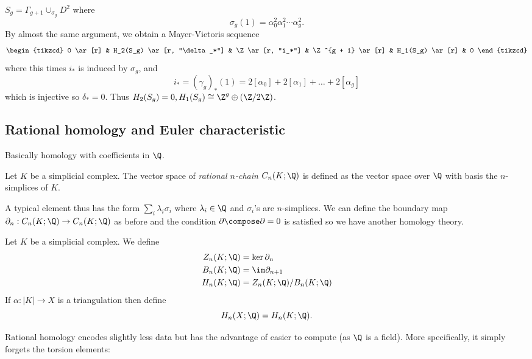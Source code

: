 \documentclass[a4paper]{article}
\renewcommand{\b}{\partial} %
\begin{document}
\begin{eg}
  \(S_g = \Gamma_{g + 1} \cup_{\sigma_g} D^2\) where
  \[
    \sigma_g(1) = \alpha_0^2 \alpha_1^2 \cdots \alpha_g^2.
  \]
  By almost the same argument, we obtain a Mayer-Vietoris sequence
  \[
    \begin{tikzcd}
      0 \ar[r] & H_2(S_g) \ar[r, "\delta_*"] & \Z \ar[r, "i_*"] & \Z^{g + 1} \ar[r] & H_1(S_g) \ar[r] & 0
    \end{tikzcd}
  \]
  where this times \(i_*\) is induced by \(\sigma_g\), and
  \[
    i_*
    = (\gamma_g)_*(1) = 2[\alpha_0] + 2[\alpha_1] + \dots + 2[\alpha_g]
  \]
  which is injective so \(\delta_* = 0\). Thus \(H_2(S_g) = 0, H_1(S_g) \cong \Z^g \oplus (\Z/2\Z)\).
\end{eg}

\subsection{Rational homology and Euler characteristic}

Basically homology with coefficients in \(\Q\).

\begin{definition}
  Let \(K\) be a simplicial complex. The vector space of \emph{rational \(n\)-chain} \(C_n(K; \Q)\) is defined as the vector space over \(\Q\) with basis the \(n\)-simplices of \(K\).
\end{definition}

A typical element thus has the form \(\sum_i \lambda_i \sigma_i\) where \(\lambda_i \in \Q\) and \(\sigma_i\)'s are \(n\)-simplices. We can define the boundary map \(\b_n: C_n(K; \Q) \to C_n(K; \Q)\) as before and the condition \(\b \compose \b = 0\) is satisfied so we have another homology theory.

\begin{definition}
  Let \(K\) be a simplicial complex. We define
  \begin{align*}
    Z_n(K; \Q) &= \ker \b_n \\
    B_n(K; \Q) &= \im \b_{n + 1} \\
    H_n(K; \Q) &= Z_n(K; \Q)/B_n(K; \Q)
  \end{align*}
  If \(\alpha: |K| \to X\) is a triangulation then define
  \[
    H_n(X; \Q) = H_n(K; \Q).
  \]
\end{definition}

Rational homology encodes slightly less data but has the advantage of easier to compute (as \(\Q\) is a field). More specifically, it simply forgets the torsion elements:
\end{document}
